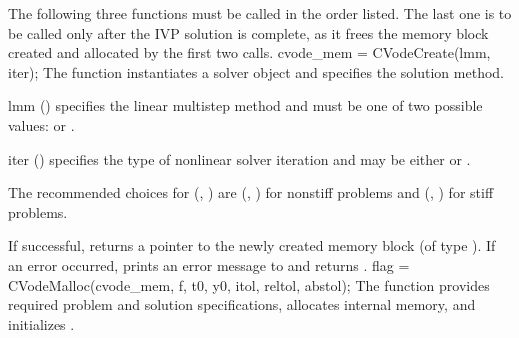 The following three functions must be called in the order listed. The last one
is to be called only after the IVP solution is complete, as it frees the
{\cvode} memory block created and allocated by the first two calls.
{
  cvode\_mem = CVodeCreate(lmm, iter);
}
{
  The function  instantiates a {\cvode} solver object and
  specifies the solution method.
}
{
  \begin{args}[iter]
  \item[lmm] ()
    specifies the linear multistep method and must be one of two
    possible values:  or .     
  \item[iter] ()
    specifies the type of nonlinear solver iteration and may be
    either  or . 
  \end{args}
  The recommended choices for (, ) are
  (, ) for nonstiff problems and
  (, ) for stiff problems.
}
{
  If successful,  returns a pointer to the newly created 
  {\cvode} memory block (of type ).
  If an error occurred,  prints an error message to 
  and returns .
}
{}
{
flag = CVodeMalloc(cvode\_mem, f, t0, y0, itol, reltol, abstol);
}
{
  The function  provides required problem and solution
  specifications, allocates internal memory, and initializes {\cvode}.
}
